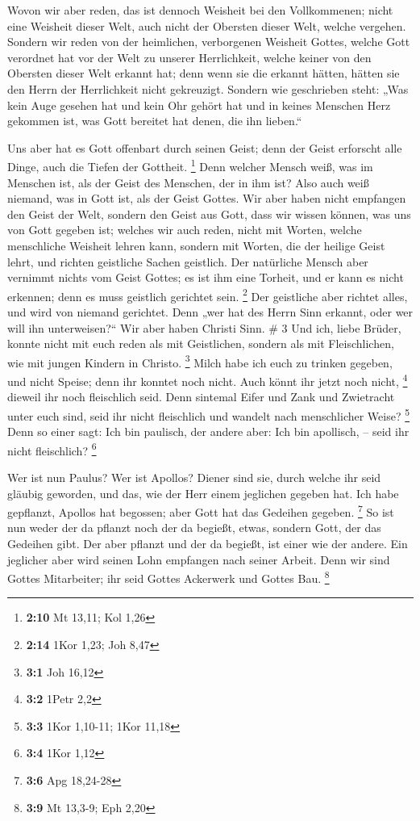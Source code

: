  Wovon wir aber reden, das ist dennoch Weisheit bei den
Vollkommenen; nicht eine Weisheit dieser Welt, auch nicht der Obersten
dieser Welt, welche vergehen.  Sondern wir reden von der
heimlichen, verborgenen Weisheit Gottes, welche Gott verordnet hat vor
der Welt zu unserer Herrlichkeit,  welche keiner von den
Obersten dieser Welt erkannt hat; denn wenn sie die erkannt hätten,
hätten sie den Herrn der Herrlichkeit nicht gekreuzigt. 
Sondern wie geschrieben steht: „Was kein Auge gesehen hat und kein Ohr
gehört hat und in keines Menschen Herz gekommen ist, was Gott bereitet
hat denen, die ihn lieben.``

 Uns aber hat es Gott offenbart durch seinen Geist; denn
der Geist erforscht alle Dinge, auch die Tiefen der Gottheit.
\footnote{\textbf{2:10} Mt 13,11; Kol 1,26}  Denn welcher
Mensch weiß, was im Menschen ist, als der Geist des Menschen, der in ihm
ist? Also auch weiß niemand, was in Gott ist, als der Geist Gottes.
 Wir aber haben nicht empfangen den Geist der Welt, sondern
den Geist aus Gott, dass wir wissen können, was uns von Gott gegeben
ist;  welches wir auch reden, nicht mit Worten, welche
menschliche Weisheit lehren kann, sondern mit Worten, die der heilige
Geist lehrt, und richten geistliche Sachen geistlich.  Der
natürliche Mensch aber vernimmt nichts vom Geist Gottes; es ist ihm eine
Torheit, und er kann es nicht erkennen; denn es muss geistlich gerichtet
sein. \footnote{\textbf{2:14} 1Kor 1,23; Joh 8,47}  Der
geistliche aber richtet alles, und wird von niemand gerichtet.
 Denn „wer hat des Herrn Sinn erkannt, oder wer will ihn
unterweisen?{}`` Wir aber haben Christi Sinn. \# 3  Und ich,
liebe Brüder, konnte nicht mit euch reden als mit Geistlichen, sondern
als mit Fleischlichen, wie mit jungen Kindern in Christo. \footnote{\textbf{3:1}
  Joh 16,12}  Milch habe ich euch zu trinken gegeben, und
nicht Speise; denn ihr konntet noch nicht. Auch könnt ihr jetzt noch
nicht, \footnote{\textbf{3:2} 1Petr 2,2}  dieweil ihr noch
fleischlich seid. Denn sintemal Eifer und Zank und Zwietracht unter euch
sind, seid ihr nicht fleischlich und wandelt nach menschlicher Weise?
\footnote{\textbf{3:3} 1Kor 1,10-11; 1Kor 11,18}  Denn so
einer sagt: Ich bin paulisch, der andere aber: Ich bin apollisch, --
seid ihr nicht fleischlich? \footnote{\textbf{3:4} 1Kor 1,12}

 Wer ist nun Paulus? Wer ist Apollos? Diener sind sie, durch
welche ihr seid gläubig geworden, und das, wie der Herr einem jeglichen
gegeben hat.  Ich habe gepflanzt, Apollos hat begossen; aber
Gott hat das Gedeihen gegeben. \footnote{\textbf{3:6} Apg 18,24-28}
 So ist nun weder der da pflanzt noch der da begießt, etwas,
sondern Gott, der das Gedeihen gibt.  Der aber pflanzt und
der da begießt, ist einer wie der andere. Ein jeglicher aber wird seinen
Lohn empfangen nach seiner Arbeit.  Denn wir sind Gottes
Mitarbeiter; ihr seid Gottes Ackerwerk und Gottes Bau. \footnote{\textbf{3:9}
  Mt 13,3-9; Eph 2,20}

